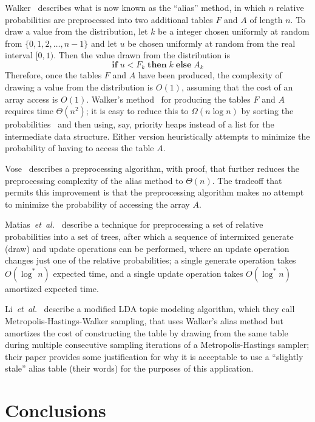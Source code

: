 \documentclass[10pt,nohyperref]{sigplanconf}
\begin{document}
Walker~\cite{Walker-arbitrary-1974,Walker-TOMS-1977} describes what is now known as the ``alias'' method,
in which $n$ relative probabilities are preprocessed into two additional tables $F$ and $A$ of length $n$.  To draw a value
from the distribution, let $k$ be a integer chosen uniformly at random from $\{ 0, 1, 2, \ldots , n-1\}$
and let $u$ be chosen uniformly at random from the real interval $[0,1)$.  Then the value drawn from the
distribution is
$$ \mathbf{if}\;u < F_k \;\mathbf{then}\; k \;\mathbf{else}\;A_k $$
Therefore, once the tables $F$ and $A$ have been produced, the complexity of drawing a value from the distribution is $O(1)$,
assuming that the cost of an array access is $O(1)$.
Walker's method~\cite{Walker-TOMS-1977} for producing the tables $F$ and $A$ requires time $\Theta(n^2)$;
it is easy to reduce this to $\Omega(n \log n)$ by sorting the probabilities~\cite[exercise 3.4.1-7]{KNUTH-VOLUME-2}
and then using, say, priority heaps instead of a list for the intermediate data structure.
Either version heuristically attempts to minimize the probability of having to access the table $A$.

Vose~\cite{Vose-1991} describes a preprocessing algorithm, with proof, that further reduces the preprocessing complexity
of the alias method to $\Theta(n)$.  The tradeoff that permits this improvement is that the preprocessing algorithm makes
no attempt to minimize the probability of accessing the array $A$.

Matias~{\it et~al.}~\cite{Matias-1993} describe a technique for preprocessing a set of relative probabilities into a set of trees,
after which a sequence of intermixed generate (draw) and update operations can be performed, where an update operation changes
just one of the relative probabilities; a single generate operation takes $O(\log^* n)$ expected time,
and a single update operation takes $O(\log^* n)$ amortized expected time.

Li~{\it et~al.}~\cite{li_reducing_14} describe a modified LDA topic modeling algorithm, which they call
Metropolis-Hastings-Walker sampling, that uses Walker's alias method but amortizes the cost of constructing
the table by drawing from the same table during multiple consecutive sampling iterations of a Metropolis-Hastings sampler;
their paper provides some justification for why it is acceptable to use a ``slightly stale'' alias table (their words)
for the purposes of this application.



\section{Conclusions}
\end{document}
